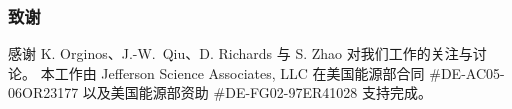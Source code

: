 \subsubsection*{致谢}
感谢 K. Orginos、\mbox{J.-W. Qiu}、D. Richards 与 S. Zhao 对我们工作的关注与讨论。
本工作由 Jefferson Science Associates, LLC 在美国能源部合同 \#DE-AC05-06OR23177
以及美国能源部资助 \#DE-FG02-97ER41028 支持完成。
